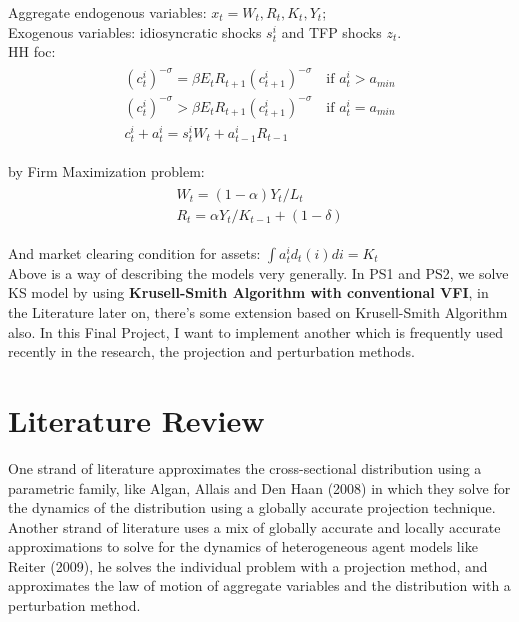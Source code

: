 Aggregate endogenous variables: $x_t = W_t,R_t,K_t,Y_t$;\\

Exogenous variables: idiosyncratic shocks $s^i_t$ and TFP shocks $z_t$.\\

HH foc: 
\begin{align}
\begin{split}
(c^i_t)^{-\sigma} = \beta E_t R_{t+1}(c^i_{t+1})^{-\sigma} \quad \text{if } a^i_t > a_{min} \\
(c^i_t)^{-\sigma} > \beta E_t R_{t+1}(c^i_{t+1})^{-\sigma} \quad \text{if } a^i_t = a_{min} \\
c^i_t + a^i_t = s^i_t W_t + a^i_{t-1} R_{t-1}
\end{split}\label{hhfoc}
\end{align}

by Firm Maximization problem: 
\begin{align}
\begin{split}
W_t = (1-\alpha)Y_t/L_{t} \\
R_t = \alpha Y_t/K_{t-1} + (1- \delta)
\end{split}
\end{align} 


And market clearing condition for assets: $\int a^i_t d_t (i)di = K_t$\\

Above is a way of describing the models very generally. In {\color{red} PS1 and PS2}, we solve KS model by using \textbf{Krusell-Smith Algorithm with conventional VFI}, in the Literature later on, there's some extension based on Krusell-Smith Algorithm also. In this Final Project, I want to implement another which is frequently used recently in the research, the projection and perturbation methods.\\

\section{Literature Review}\label{secLiter}

One strand of literature approximates the cross-sectional distribution using a parametric family, like Algan, Allais and Den Haan (2008)\cite{algan2008solving} in which they solve for the dynamics of the distribution using a globally accurate projection technique.\\

Another strand of literature uses a mix of globally accurate and locally accurate approximations to solve for the dynamics of heterogeneous agent models like Reiter (2009)\cite{reiter2009solving}, he solves the individual problem with a projection method, and approximates the law of motion of aggregate variables and the distribution with a perturbation method.\\

